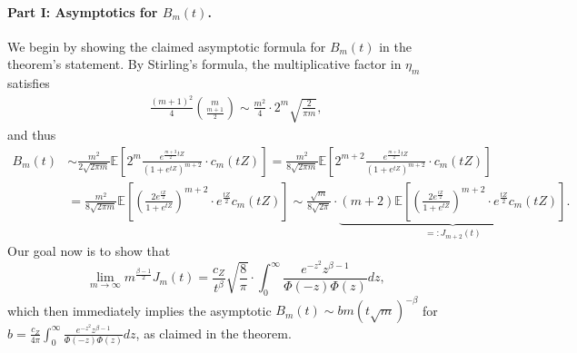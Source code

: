 \documentclass[11pt]{article}
\newcommand{\E}{\mathbb{E}}
\newcommand{\prn}[1]{\left({#1}\right)} %
\newcommand{\brk}[1]{\left[{#1}\right]} %
\newcommand{\<}{\langle} %
\renewcommand{\>}{\rangle}
\begin{document}
\paragraph{Part I: Asymptotics for $B_m(t)$.}
We begin by showing the claimed asymptotic formula for $B_m(t)$ in
the theorem's statement.
By Stirling's formula, the multiplicative factor in $\eta_m$ satisfies
\begin{align*}
	\frac{(m+1)^2}{4} \binom{m}{\frac{m+1}{2}} \sim \frac{m^2}{4} \cdot 2^m \sqrt{\frac{2}{\pi m}},
\end{align*}
and thus
\begin{align*}
	B_m(t) &\sim \frac{m^2}{2 \sqrt{2 \pi m}} \E \brk{2^m \frac{e^{\frac{m+3}{2}tZ}}{(1+e^{tZ})^{m+2}} \cdot c_m(tZ)} = \frac{m^2}{8 \sqrt{2 \pi m}} \E \brk{2^{m+2} \frac{e^{\frac{m+3}{2}tZ}}{(1+e^{tZ})^{m+2}} \cdot c_m(tZ)} \nonumber \\
	& = \frac{m^2}{8 \sqrt{2 \pi m}} \E \brk{\prn{\frac{2 e^{\frac{tZ}{2}}}{1 + e^{tZ}}}^{m+2}\cdot e^{\frac{tZ}{2}} c_m(tZ)} \sim \frac{\sqrt{m}}{8\sqrt{2\pi}} \cdot \underbrace{(m+2) \E \brk{\prn{\frac{2 e^{\frac{tZ}{2}}}{1 + e^{tZ}}}^{m+2}\cdot e^{\frac{tZ}{2}} c_m(tZ)}}_{=:J_{m+2}(t)}.
\end{align*}
Our goal now is to show that
\begin{equation}
  \label{eqn:J-m-limit-term}
  \lim_{m \to \infty} m^{\frac{\beta - 1}{2}}
  J_m(t)
  = \frac{c_Z}{t^\beta} \sqrt{\frac{8}{\pi}}
  \cdot \int_0^\infty \frac{e^{-z^2} z^{\beta - 1}}{\Phi(-z) \Phi(z)} dz,
\end{equation}
which then immediately implies the asymptotic
$B_m(t) \sim b m (t \sqrt{m})^{-\beta}$
for $b = \frac{c_Z}{4\pi} \int_0^\infty \frac{e^{-z^2} z^{\beta - 1}}{
  \Phi(-z) \Phi(z)} dz$, as claimed in the theorem.
\end{document}
